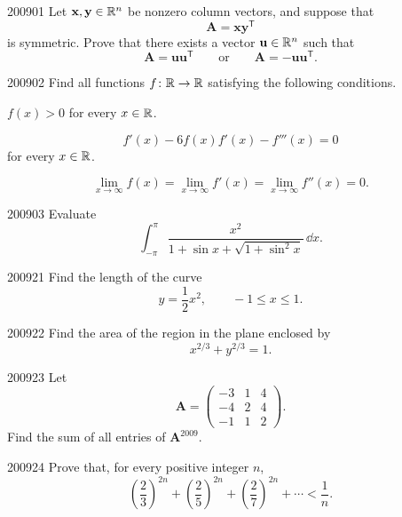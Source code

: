 
\begin{problem}{2009}{0}{1}
Let $\mathbf x, \mathbf y\in\mathbb{R}^n$ be nonzero column vectors, and suppose that
\[
    \mathbf A=\mathbf x\mathbf y^{\mathsf T}
\]
is symmetric. Prove that there exists a vector $\mathbf u\in\mathbb{R}^n$ such that
\[
    \mathbf A=\mathbf u\mathbf u^{\mathsf T}
    \qquad\text{or}\qquad
    \mathbf A=-\mathbf u\mathbf u^{\mathsf T}.
\]
\end{problem}

\begin{problem}{2009}{0}{2}
Find all functions $f\colon\mathbb{R}\to\mathbb{R}$ satisfying the following conditions.
\begin{problemclauses}
    \item $f(x)>0$ for every $x\in\mathbb{R}$.
    \item
    \[
        f'(x)-6f(x)f'(x)-f'''(x)=0
    \]
    for every $x\in\mathbb{R}$.
    \item
    \[
        \lim_{x\to\infty}f(x)
        =\lim_{x\to\infty}f'(x)
        =\lim_{x\to\infty}f''(x)
        =0.
    \]
\end{problemclauses}
\end{problem}

\begin{problem}{2009}{0}{3}
Evaluate
\[
    \int_{-\pi}^{\pi}
    \frac{x^2}{1+\sin x+\sqrt{1+\sin^2x}}\, \dd x.
\]
\end{problem}

\begin{problem}{2009}{2}{1}
Find the length of the curve
\[
    y=\frac12x^2,
    \qquad -1\le x\le1.
\]
\end{problem}

\begin{problem}{2009}{2}{2}
Find the area of the region in the plane enclosed by
\[
    x^{2/3}+y^{2/3}=1.
\]
\end{problem}

\begin{problem}{2009}{2}{3}
Let
\[
    \mathbf A=
    \begin{pmatrix}
        -3&1&4\\
        -4&2&4\\
        -1&1&2
    \end{pmatrix}.
\]
Find the sum of all entries of $\mathbf A^{2009}$.
\end{problem}

\begin{problem}{2009}{2}{4}
Prove that, for every positive integer $n$,
\[
    \left(\frac23\right)^{2n}
    +\left(\frac25\right)^{2n}
    +\left(\frac27\right)^{2n}
    +\cdots
    <\frac1n.
\]
\end{problem}


